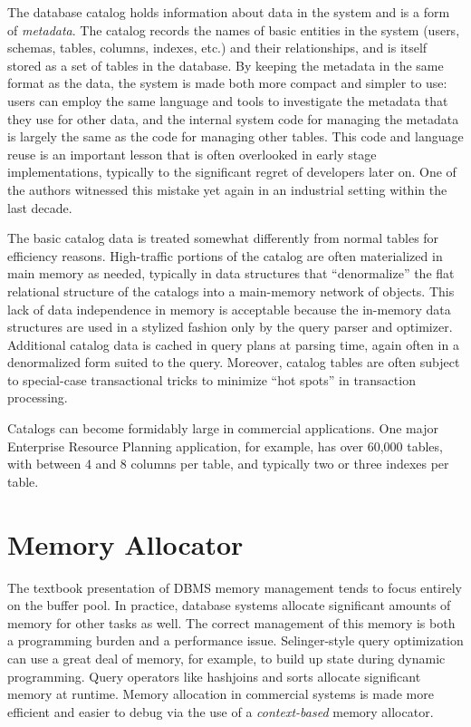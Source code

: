 \documentclass[a4paper,11pt,twoside,openright]{book}
\begin{document}
The database catalog holds information about data in the system and is a
form of \emph{metadata}. The catalog records the names of basic entities
in the system (users, schemas, tables, columns, indexes, etc.) and their
relationships, and is itself stored as a set of tables in the database.
By keeping the metadata in the same format as the data, the system is
made both more compact and simpler to use: users can employ the same
language and tools to investigate the metadata that they use for other
data, and the internal system code for managing the metadata is largely
the same as the code for managing other tables. This code and language
reuse is an important lesson that is often overlooked in early stage
implementations, typically to the significant regret of developers later
on. One of the authors witnessed this mistake yet again in an industrial
setting within the last decade.

The basic catalog data is treated somewhat differently from normal
tables for efficiency reasons. High-traffic portions of the catalog are
often materialized in main memory as needed, typically in data
structures that ``denormalize'' the flat relational structure of the
catalogs into a main-memory network of objects. This lack of data
independence in memory is acceptable because the in-memory data
structures are used in a stylized fashion only by the query parser and
optimizer. Additional catalog data is cached in query plans at parsing
time, again often in a denormalized form suited to the query. Moreover,
catalog tables are often subject to special-case transactional tricks to
minimize ``hot spots'' in transaction processing.

Catalogs can become formidably large in commercial applications. One
major Enterprise Resource Planning application, for example, has over
60,000 tables, with between 4 and 8 columns per table, and typically two
or three indexes per table.

\hypertarget{memory-allocator}{%
\section{Memory Allocator}\label{memory-allocator}}

The textbook presentation of DBMS memory management tends to focus
entirely on the buffer pool. In practice, database systems allocate
significant amounts of memory for other tasks as well. The correct
management of this memory is both a programming burden and a performance
issue. Selinger-style query optimization can use a great deal of memory,
for example, to build up state during dynamic programming. Query
operators like hashjoins and sorts allocate significant memory at
runtime. Memory allocation in commercial systems is made more efficient
and easier to debug via the use of a \emph{context-based} memory
allocator.
\end{document}

